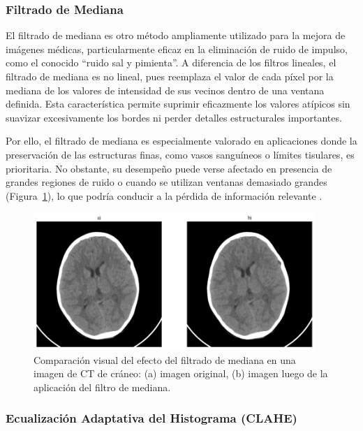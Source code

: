 \subsubsection{Filtrado de Mediana}

El filtrado de mediana es otro método ampliamente utilizado para la mejora de imágenes médicas, particularmente eficaz en la eliminación de ruido de impulso, como el conocido ``ruido sal y pimienta''. A diferencia de los filtros lineales, el filtrado de mediana es no lineal, pues reemplaza el valor de cada píxel por la mediana de los valores de intensidad de sus vecinos dentro de una ventana definida. Esta característica permite suprimir eficazmente los valores atípicos sin suavizar excesivamente los bordes ni perder detalles estructurales importantes.

Por ello, el filtrado de mediana es especialmente valorado en aplicaciones donde la preservación de las estructuras finas, como vasos sanguíneos o límites tisulares, es prioritaria. No obstante, su desempeño puede verse afectado en presencia de grandes regiones de ruido o cuando se utilizan ventanas demasiado grandes (Figura~\ref{fig:filter-median}), lo que podría conducir a la pérdida de información relevante \cite{ImageProcessingBook}.

\begin{figure}[H]
    \centering
    \includegraphics[width=0.95\textwidth]{Graphics/median-filter.png}
    \caption{Comparación visual del efecto del filtrado de mediana en una imagen de CT de cráneo: (a) imagen original, (b) imagen luego de la aplicación del filtro de mediana.}
    \label{fig:filter-median}
\end{figure}

\subsubsection{Ecualización Adaptativa del Histograma (CLAHE)}

